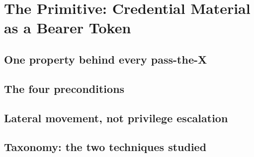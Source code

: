 \section{The Primitive: Credential Material as a Bearer Token}
\unwritten
\label{sec:framing}

\subsection{One property behind every pass-the-X}
\unwritten

\subsection{The four preconditions}
\unwritten

\subsection{Lateral movement, not privilege escalation}
\unwritten

\subsection{Taxonomy: the two techniques studied}
\unwritten

